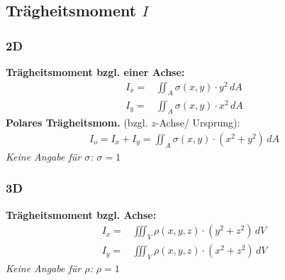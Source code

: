 \subsection{Trägheitsmoment \texorpdfstring{\hfill $I$}{I}}
    \subsubsection{2D}
        \textbf{Trägheitsmoment bzgl. einer Achse:}
        \begin{align*}
            I_x =& \iint_A \sigma(x,y) \cdot y^2 \, dA\\
            I_y =& \iint_A \sigma(x,y) \cdot x^2 \, dA
        \end{align*}
        \textbf{Polares Trägheitsmom.} (bzgl. $z$-Achse/ Ursprung):
        \begin{align*}
            I_o = I_x + I_y = \iint_A \sigma(x,y) \cdot (x^2 + y^2) \, dA 
        \end{align*}
        \textit{Keine Angabe für $\sigma$: $\sigma = 1$}

    \subsubsection{3D}
        \textbf{Trägheitsmoment bzgl. Achse:}
        \begin{align*}
            I_x =& \iiint_V \rho(x,y,z) \cdot (y^2 + z^2) \, dV\\
            I_y =& \iiint_V \rho(x,y,z) \cdot (x^2 + z^2) \, dV
        \end{align*}
        \textit{Keine Angabe für $\rho$: $\rho = 1$}
        

